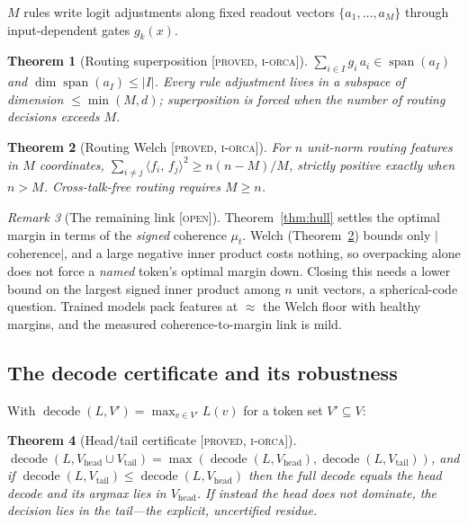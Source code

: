 \documentclass[11pt]{article}
\theoremstyle{definition}
\theoremstyle{plain}
\newtheorem{theorem}{Theorem}[section]
\theoremstyle{remark}
\newtheorem{remark}[theorem]{Remark}
\newcommand{\proved}{\textsc{[proved, i-orca]}}
\newcommand{\open}{\textsc{[open]}}
\newcommand{\inner}[2]{\langle #1,\, #2\rangle}
\newcommand{\Vh}{V_{\mathrm{head}}}
\newcommand{\Vt}{V_{\mathrm{tail}}}
\begin{document}
$M$ rules write logit adjustments along fixed readout vectors $\{a_1,\dots,a_M\}$ through
input-dependent gates $g_k(x)$.

\begin{theorem}[Routing superposition \proved{}]\label{thm:rank}
$\sum_{i\in I}g_i\,a_i\in\operatorname{span}(a_I)$ and $\dim\operatorname{span}(a_I)\le|I|$. Every rule
adjustment lives in a subspace of dimension $\le\min(M,d)$; superposition is forced when the number of
routing decisions exceeds $M$.
\end{theorem}

\begin{theorem}[Routing Welch \proved{}]\label{thm:welch}
For $n$ unit-norm routing features in $M$ coordinates,
$\sum_{i\neq j}\inner{f_i}{f_j}^2\ge n(n-M)/M$, strictly positive exactly when $n>M$. Cross-talk-free
routing requires $M\ge n$.
\end{theorem}

\begin{remark}[The remaining link \open{}]
Theorem~\ref{thm:hull} settles the optimal margin in terms of the \emph{signed} coherence $\mu_t$. Welch
(Theorem~\ref{thm:welch}) bounds only $\lvert$coherence$\rvert$, and a large negative inner product costs
nothing, so overpacking alone does not force a \emph{named} token's optimal margin down. Closing this needs a
lower bound on the largest signed inner product among $n$ unit vectors, a spherical-code question. Trained
models pack features at $\approx$ the Welch floor with healthy margins, and the measured coherence-to-margin
link is mild.
\end{remark}

\subsection{The decode certificate and its robustness}

With $\operatorname{decode}(L,V')=\max_{v\in V'}L(v)$ for a token set $V'\subseteq V$:

\begin{theorem}[Head/tail certificate \proved{}]\label{thm:headtail}
$\operatorname{decode}(L,\Vh\cup\Vt)=\max(\operatorname{decode}(L,\Vh),\operatorname{decode}(L,\Vt))$, and if
$\operatorname{decode}(L,\Vt)\le\operatorname{decode}(L,\Vh)$ then the full decode equals the head decode and
its argmax lies in $\Vh$. If instead the head does not dominate, the decision lies in the tail---the
explicit, uncertified residue.
\end{theorem}
\end{document}
